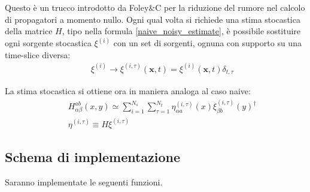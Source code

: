 \documentclass[a4paper]{article}
\begin{document}
Questo \`{e} un trucco introdotto da Foley\&C \cite{Foley:2005ac} per la riduzione del rumore nel calcolo di propagatori a momento nullo. Ogni qual volta si richiede una stima stocastica della matrice $H$, tipo nella formula \ref{naive_noisy_estimate}, \`{e} possibile sostituire ogni sorgente stocastica $\xi^{(i)}$ con un set di sorgenti, ognuna con supporto su una time-slice diversa:
\begin{eqnarray} \label{time_dilution}
&& \xi^{(i)} \rightarrow \xi^{(i,\tau)}(\mathbf{x},t) = \xi^{(i)}(\mathbf{x},t) \delta_{t,\tau}
\end{eqnarray}

La stima stocastica si ottiene ora in maniera analoga al caso naive:
\begin{eqnarray}
&& H_{\alpha \beta}^{a b}(x,y) \simeq \sum_{i=1}^{N_s} \sum_{\tau=1}^{N_t} \eta^{(i,\tau)}_{\alpha a}(x) \xi^{(i,\tau)}_{\beta b}(y)^\dagger \label{diluted_noisy_estimate} \\
&& \eta^{(i,\tau)} \equiv H \xi^{(i,\tau)} \nonumber
\end{eqnarray}



\subsection{Schema di implementazione}

Saranno implementate le seguenti funzioni.
\end{document}
